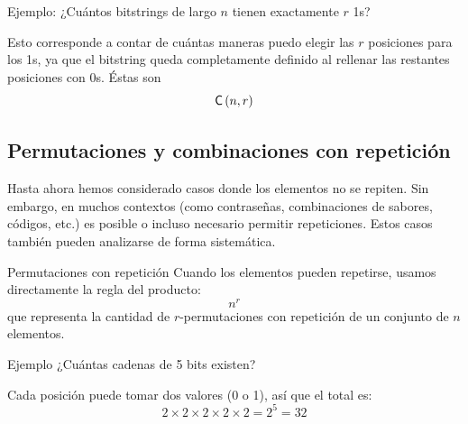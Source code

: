 \begin{exampleblock}{Ejemplo: ¿Cuántos bitstrings de largo $n$ tienen exactamente $r$ 1s?}

Esto corresponde a contar de cuántas maneras puedo elegir las $r$ posiciones
para los 1s, ya que el bitstring queda completamente definido al rellenar las
restantes posiciones con 0s.  Éstas son
\[
\mathsf{C}\left(n,r\right)
\]
\end{exampleblock}

\subsection{Permutaciones y combinaciones con repetición}

Hasta ahora hemos considerado casos donde los elementos no se repiten. Sin embargo, en muchos contextos (como contraseñas, combinaciones de sabores, códigos, etc.) es posible o incluso necesario permitir repeticiones. Estos casos también pueden analizarse de forma sistemática.

\begin{definitionblock}{Permutaciones con repetición}
Cuando los elementos pueden repetirse, usamos directamente la regla del producto:
\[
n^r
\]
que representa la cantidad de $r$-permutaciones con repetición de un conjunto de $n$ elementos.
\end{definitionblock}

\begin{exampleblock}{Ejemplo}
¿Cuántas cadenas de 5 bits existen?

Cada posición puede tomar dos valores (0 o 1), así que el total es:
\[
2 \times 2 \times 2 \times 2 \times 2 = 2^5 = 32
\]
\end{exampleblock}

